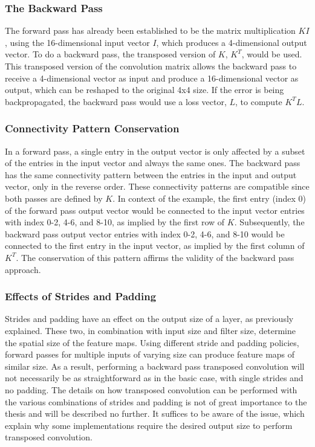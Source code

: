\subsubsection{The Backward Pass}

The forward pass has already been established to be the matrix multiplication $KI$, using the 16-dimensional input vector $I$, which produces a 4-dimensional output vector. To do a backward pass, the transposed version of $K$, $K^T$, would be used. This transposed version of the convolution matrix allows the backward pass to receive a 4-dimensional vector as input and produce a 16-dimensional vector as output, which can be reshaped to the original 4x4 size. If the error is being backpropagated, the backward pass would use a loss vector, $L$, to compute $K^T L$. 

\subsubsection{Connectivity Pattern Conservation}

In a forward pass, a single entry in the output vector is only affected by a subset of the entries in the input vector and always the same ones. The backward pass has the same connectivity pattern between the entries in the input and output vector, only in the reverse order. These connectivity patterns are compatible since both passes are defined by $K$. In context of the example, the first entry (index 0) of the forward pass output vector would be connected to the input vector entries with index 0-2, 4-6, and 8-10, as implied by the first row of $K$. Subsequently, the backward pass output vector entries with index 0-2, 4-6, and 8-10 would be connected to the first entry in the input vector, as implied by the first column of $K^T$. The conservation of this pattern affirms the validity of the backward pass approach.

\subsubsection{Effects of Strides and Padding}

Strides and padding have an effect on the output size of a layer, as previously explained. These two, in combination with input size and filter size, determine the spatial size of the feature maps. Using different stride and padding policies, forward passes for multiple inputs of varying size can produce feature maps of similar size. As a result, performing a backward pass transposed convolution will not necessarily be as straightforward as in the basic case, with single strides and no padding. The details on how transposed convolution can be performed with the various combinations of strides and padding is not of great importance to the thesis and will be described no further. It suffices to be aware of the issue, which explain why some implementations require the desired output size to perform transposed convolution.

